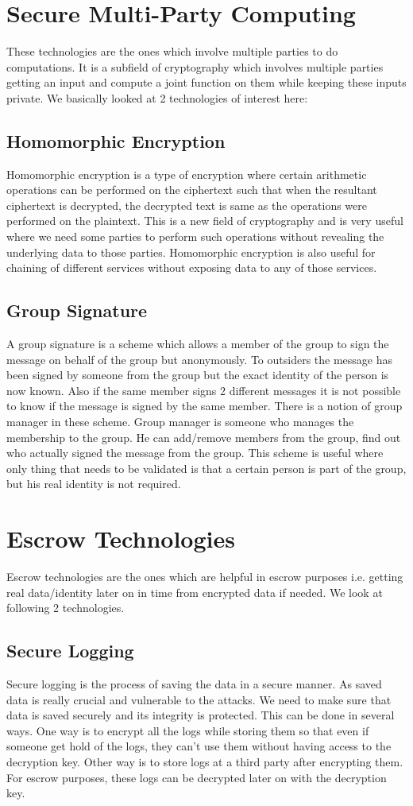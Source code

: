 \section{Secure Multi-Party Computing}
These technologies are the ones which involve multiple parties to do computations. It is a subfield of cryptography which involves multiple parties getting an input and compute a joint function on them while keeping these inputs private. We basically looked at 2 technologies of interest here:
\subsection{Homomorphic Encryption}
Homomorphic encryption is a type of encryption where certain arithmetic operations can be performed on the ciphertext such that when the resultant ciphertext is decrypted, the decrypted text is same as the operations were performed on the plaintext. This is a new field of cryptography and is very useful where we need some parties to perform such operations without revealing the underlying data to those parties. Homomorphic encryption is also useful for chaining of different services without exposing data to any of those services.
\subsection{Group Signature}
A group signature is a scheme which allows a member of the group to sign the message on behalf of the group but anonymously. To outsiders the message has been signed by someone from the group but the exact identity of the person is now known. Also if the same member signs 2 different messages it is not possible to know if the message is signed by the same member. There is a notion of group manager in these scheme. Group manager is someone who manages the membership to the group. He can add/remove members from the group, find out who actually signed the message from the group. This scheme is useful where only thing that needs to be validated is that a certain person is part of the group, but his real identity is not required.
\section{Escrow Technologies}
Escrow technologies are the ones which are helpful in escrow purposes i.e. getting real data/identity later on in time from encrypted data if needed. We look at following 2 technologies.
\subsection{Secure Logging}
Secure logging is the process of saving the data in a secure manner. As saved data is really crucial and vulnerable to the attacks. We need to make sure that data is saved securely and its integrity is protected. This can be done in several ways. One way is to encrypt all the logs while storing them so that even if someone get hold of the logs, they can't use them without having access to the decryption key. Other way is to store logs at a third party after encrypting them. For escrow purposes, these logs can be decrypted later on with the decryption key.
